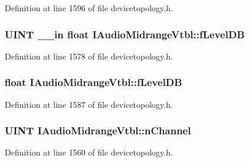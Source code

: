 Definition at line 1596 of file devicetopology.\+h.

\subsubsection[{\texorpdfstring{f\+Level\+DB}{fLevelDB}}]{ {\bf U\+I\+NT} {\bf \+\_\+\+\_\+in} float I\+Audio\+Midrange\+Vtbl\+::f\+Level\+DB}\hypertarget{struct_i_audio_midrange_vtbl_ad73d63c4ecaa6446a53feb1e6bcfb0cf}{}\label{struct_i_audio_midrange_vtbl_ad73d63c4ecaa6446a53feb1e6bcfb0cf}


Definition at line 1578 of file devicetopology.\+h.

\subsubsection[{\texorpdfstring{f\+Level\+DB}{fLevelDB}}]{ float I\+Audio\+Midrange\+Vtbl\+::f\+Level\+DB}\hypertarget{struct_i_audio_midrange_vtbl_a575bd31ba20fb4926ac8e38428ae9659}{}\label{struct_i_audio_midrange_vtbl_a575bd31ba20fb4926ac8e38428ae9659}


Definition at line 1587 of file devicetopology.\+h.

\subsubsection[{\texorpdfstring{n\+Channel}{nChannel}}]{ {\bf U\+I\+NT} I\+Audio\+Midrange\+Vtbl\+::n\+Channel}\hypertarget{struct_i_audio_midrange_vtbl_ac2ba7cd3ad889e27ed7d2014c00877ca}{}\label{struct_i_audio_midrange_vtbl_ac2ba7cd3ad889e27ed7d2014c00877ca}


Definition at line 1560 of file devicetopology.\+h.

